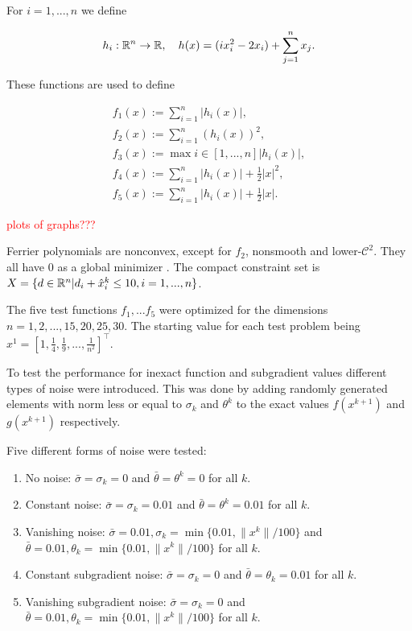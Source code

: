 For \(i = 1,...,n\) we define 

\begin{align*}
	h_i: \mathbb{R}^n \to \mathbb{R}, \quad h(x) = (ix_i^2-2x_i)+\sum_{j=1}^n x_j.
\end{align*}

These functions are used to define

\begin{align*}
	f_1(x) := \sum_{i=1}^n |h_i(x)|, \\
	f_2(x) := \sum_{i=1}^n (h_i(x))^2, \\
	f_3(x) := \max{i \in [1,...,n]}|h_i(x)|, \\
	f_4(x) := \sum_{i=1}^n |h_i(x)|+\frac{1}{2}|x|^2, \\
	f_5(x) := \sum_{i=1}^n |h_i(x)|+\frac{1}{2}|x|.
\end{align*}

\textcolor{red}{plots of graphs???}

Ferrier polynomials are nonconvex, except for \(f_2\), nonsmooth and lower-\(\mathcal{C}^2\). They all have \(0\) as a global minimizer \cite{Hare2010}. The compact constraint set is \(X=\{d \in \mathbb{R}^n|d_i+\hat{x}^k_i \leq 10, i = 1,...,n \}\).

The five test functions \(f_1,...f_5\) were optimized for the dimensions \(n=1,2,...,15,20,25,30\).
The starting value for each test problem being \(x^1=[1,\frac{1}{4},\frac{1}{9},...,\frac{1}{n^2}]^{\top}\).

To test the performance for inexact function and subgradient values different types of noise were introduced. This was done by adding randomly generated elements with norm less or equal to \(\sigma_k\) and \(\theta^k\) to the exact values \(f(x^{k+1})\) and \(g(x^{k+1})\) respectively.

Five different forms of noise were tested:

\begin{enumerate}[--]
	\item No noise: \(\bar{\sigma}=\sigma_k=0\) and \(\bar{\theta}=\theta^k=0\) for all \(k\).
	\item Constant noise: \(\bar{\sigma}=\sigma_k=0.01\) and \(\bar{\theta}=\theta^k=0.01\) for all \(k\).
	\item Vanishing noise: \(\bar{\sigma}=0.01, \sigma_k = \min\{0.01,\|x^k\|/100\}\) and \(\bar{\theta}=0.01, \theta_k=\min\{0.01,\|x^k\|/100\}\) for all \(k\).
	\item Constant subgradient noise: \(\bar{\sigma}=\sigma_k=0\) and \(\bar{\theta}=\theta_k=0.01\) for all \(k\).
	\item Vanishing subgradient noise: \(\bar{\sigma}=\sigma_k=0\) and \(\bar{\theta}=0.01, \theta_k=\min\{0.01,\|x^k\|/100\}\) for all \(k\).
\end{enumerate}

